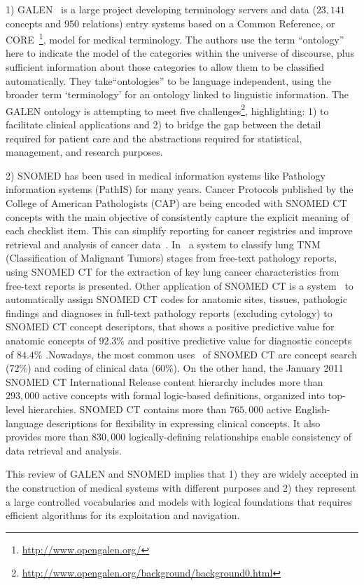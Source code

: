 1) GALEN~\cite{citeulike:3156699} is a large project developing terminology servers and data ($23,141$ concepts and $950$ relations) 
entry systems based on a Common Reference, or CORE~\footnote{\url{http://www.opengalen.org/}}, model for medical terminology. 
The authors use the term ``ontology'' here to indicate the model of the categories within the universe of discourse, 
plus sufficient information about those categories to allow them to be classified automatically.
They take``ontologies'' to be language independent, using the broader term ‘terminology’ for an ontology
linked to linguistic information. The GALEN ontology is attempting to meet five challenges\footnote{\url{http://www.opengalen.org/background/background0.html}}, highlighting:
1) to facilitate clinical applications and 2) to bridge the gap between the detail required for patient care and the abstractions required for statistical, management, and research purposes.


2) SNOMED has been used in medical information systems like Pathology information systems (PathIS)
for many years. Cancer Protocols published by the College of American Pathologists (CAP) 
are being encoded with SNOMED CT concepts with the main objective of consistently capture 
the explicit meaning of each checklist item. 
This can simplify reporting for cancer registries and improve retrieval 
and analysis of cancer data~\cite{14728542}. In~\cite{citeulike:7749740} a system to classify 
lung TNM (Classification of Malignant Tumors) stages from free-text pathology reports, 
using SNOMED CT for the extraction of  key lung cancer characteristics from free-text reports is presented. 
Other application of SNOMED CT is a system~\cite{20351885} to automatically assign SNOMED CT codes for anatomic sites, 
tissues, pathologic findings and diagnoses in full-text pathology reports (excluding cytology) 
to SNOMED CT concept descriptors, that shows a positive predictive value for anatomic 
concepts of $92.3\%$ and positive predictive value for diagnostic concepts of $84.4\%$ .Nowadays, 
the most common uses~\cite{21346970} of SNOMED CT are concept search ($72\%$) and coding of clinical data ($60\%$).
On the other hand, the January 2011 SNOMED CT International Release content hierarchy 
includes more than $293,000$ active concepts with formal logic-based definitions, 
organized into top-level hierarchies. SNOMED CT contains more than $765,000$ active 
English-language descriptions for flexibility in expressing clinical concepts. It also provides more 
than $830,000$ logically-defining relationships enable consistency of data retrieval and analysis. 

This review of GALEN and SNOMED implies that 1) they are widely accepted in the construction of medical systems with different
purposes and 2) they represent a large controlled vocabularies and models with logical foundations that requires
efficient algorithms for its exploitation and navigation.





